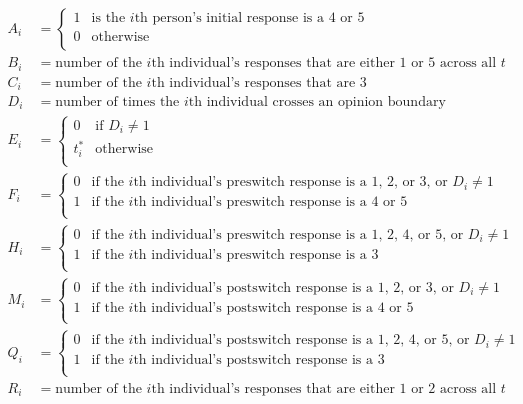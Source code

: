 \documentclass[12pt,]{article}
\begin{document}
\begin{align*}
A_i&=\begin{cases}
  1 & \text{is the }i\text{th person's initial response is a 4 or 5}\\
  0 & \text{otherwise}\\
  \end{cases} \\
B_i&=\text{number of the }i\text{th individual's responses that are either 1 or 5 across all } t \\
C_i&=\text{number of the }i\text{th individual's responses that are 3} \\
D_i&=\text{number of times the }i\text{th individual crosses an opinion boundary} \\
E_i&=\begin{cases}
  0 & \text{if } D_i \neq 1\\
  t_i^* & \text{otherwise}\\
  \end{cases} \\
F_i&=\begin{cases}
  0 & \text{if the }i\text{th individual's preswitch response is a 1, 2, or 3, or } D_i \neq 1\\
  1 & \text{if the }i\text{th individual's preswitch response is a 4 or 5}\\
  \end{cases} \\
H_i&=\begin{cases}
  0 & \text{if the }i\text{th individual's preswitch response is a 1, 2, 4, or 5, or } D_i \neq 1\\
  1 & \text{if the }i\text{th individual's preswitch response is a 3}\\
  \end{cases} \\
M_i&=\begin{cases}
  0 & \text{if the }i\text{th individual's postswitch response is a 1, 2, or 3, or } D_i \neq 1\\
  1 & \text{if the }i\text{th individual's postswitch response is a 4 or 5}\\
  \end{cases} \\
Q_i&=\begin{cases}
  0 & \text{if the }i\text{th individual's postswitch response is a 1, 2, 4, or 5, or } D_i \neq 1\\
  1 & \text{if the }i\text{th individual's postswitch response is a 3}\\
  \end{cases} \\
R_i&=\text{number of the }i\text{th individual's responses that are either 1 or 2 across all } t \\
\end{align*}
\end{document}

